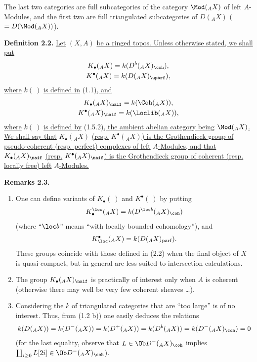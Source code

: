 %
The last two categories are full subcategories of the category \(\Mod({}_A X)\) of left \(A\)-Modules, and the first two are full triangulated subcategories of \(D({}_A X)\) (\(= D(\Mod({}_A X))\)).

\textbf{Definition 2.2.} \uline{Let} \((X,A)\) \uline{be a ringed topos. Unless otherwise stated, we shall put}
\[
 \begin{gathered}
  K_\bullet({}_A X)=k(D^b({}_A X)_{\coh}),\\
  K^{\bullet}({}_A X)=k(D({}_A X)_{\uparf}),
 \end{gathered}
\]
\uline{where} \(k(\ )\) \uline{is defined in} (1.1)\uline{, and}
\[
 \begin{gathered}
  K_\bullet({}_A X)_{\naif}=k(\Coh({}_A X)),\\
  K^{\bullet}({}_A X)_{\naif}=k(\Loclib({}_A X)),
 \end{gathered}
\]
\uline{where} \(k(\ )\) \uline{is defined by} (1.5.2)\uline{, the ambient abelian category being} \(\Mod({}_A X)\)\uline{. We shall say that} \(K_\bullet({}_A X)\) \uline{(resp.} \(K^{\bullet}({}_A X)\)\uline{) is the Grothendieck group of pseudo-coherent (resp. perfect) complexes of left} \(A\)\uline{-Modules, and that} \(K_\bullet({}_A X)_{\naif}\) \uline{(resp.} \(K^{\bullet}({}_A X)_{\naif}\)\uline{) is the Grothendieck group of coherent (resp. locally free) left} \(A\)\uline{-Modules.}

\textbf{Remarks 2.3.}
\begin{enumerate}[label=\alph*)]
\item One can define variants of \(K_\bullet(\ )\) and \(K^{\bullet}(\ )\) by putting
\[
 K_\bullet^{\loc}({}_A X)=k(D^{\loc b}({}_A X)_{\coh})
\]
(where ``\(\loc b\)'' means ``with locally bounded cohomology''), and
\[
 K^{\bullet}_{\loc}({}_A X)=k(D({}_A X)_{\mathrm{parf}}).
\]
These groups coincide with those defined in (2.2) when the final object of \(X\) is quasi-compact, but in general are less suited to intersection calculations.

\item{}%
The group \(K_\bullet({}_A X)_{\naif}\) is practically of interest only when \(A\) is coherent (otherwise there may well be very few coherent sheaves \ldots).
\item Considering the \(k\) of triangulated categories that are ``too large'' is of no interest. Thus, from (1.2 b)) one easily deduces the relations
\[
 k(D({}_A X))=k(D^-({}_A X))=k(D^+({}_A X))=k(D^b({}_A X))=k(D^-({}_A X)_{\coh})=0
\]
(for the last equality, observe that \(L\in\Ob D^-({}_A X)_{\coh}\) implies \(\coprod_{i\geq0}L[2i]\in\Ob D^-({}_A X)_{\coh}\)).
\end{enumerate}

